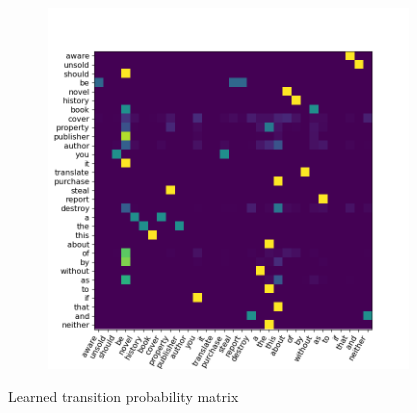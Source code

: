 \begin{frame}
\begin{columns}
\begin{column}{0.33\textwidth}
\begin{figure}
				\centering
					\includegraphics[height=1.1\columnwidth]{Bilder/BspW2W/plots/OHE_OHE_500E_100BS_1L_1C_5P_30T_J/Transition_Probability_Matrix;_t=1,_DF=0.5.png}
			\end{figure}
			\begin{center}
                {\large Learned transition probability matrix}
			\end{center}
		\end{column}
		\begin{column}{0.33\textwidth}
            \vspace*{8.5mm}
			\begin{figure}
				\centering

\end{figure}
\end{column}
\end{columns}
\end{frame}
